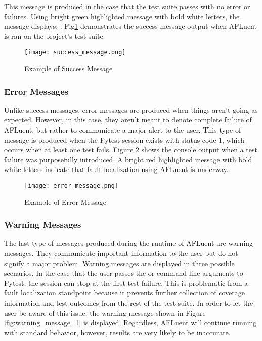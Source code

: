 This message is produced in the case that the test suite passes with no
error or failures. Using bright green highlighted message with bold white
letters, the message displays: . Fig\ref{fig:success_message} demonstrates the success message output
when AFLuent is ran on the project's test suite.

\begin{figure}[!htb]
	\begin{center}
		\texttt{[image: success\_message.png]}
		\caption{\label{fig:success_message} Example of Success Message}
	\end{center}
\end{figure}


\subsubsection{Error Messages}
\label{subsubsec:error_message}

Unlike success messages, error messages are produced when things aren't going as
expected. However, in this case, they aren't meant to denote complete failure of
AFLuent, but rather to communicate a major alert to the user. This type of
message is produced when the Pytest session exists with status code 1, which
occurs when at least one test fails. Figure \ref{fig:error_message} shows the
console output when a test failure was purposefully introduced. A bright red
highlighted message with bold white letters indicate that fault localization
using AFLuent is underway.

\begin{figure}[!htb]
	\begin{center}
		\texttt{[image: error\_message.png]}
		\caption{\label{fig:error_message} Example of Error Message}
	\end{center}
\end{figure}

\subsubsection{Warning Messages}
\label{subsubsec:warning_message}

The last type of messages produced during the runtime of AFLuent are warning
messages. They communicate important information to the user but do not signify
a major problem. Warning messages are displayed in three possible scenarios. In
the case that the user passes the  or  command line
arguments to Pytest, the session can stop at the first test failure. This is
problematic from a fault localization standpoint because it prevents further
collection of coverage information and test outcomes from the rest of the test
suite. In order to let the user be aware of this issue, the warning message
shown in Figure \ref{fig:warning_message_1} is displayed. Regardless, AFLuent will
continue running with standard behavior, however, results are very likely to be
inaccurate.

